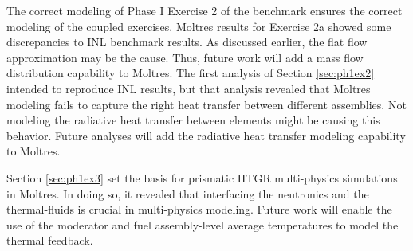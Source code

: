 The correct modeling of Phase I Exercise 2 of the benchmark ensures the correct modeling of the coupled exercises.
Moltres results for Exercise 2a showed some discrepancies to INL benchmark results.
As discussed earlier, the flat flow approximation may be the cause.
Thus, future work will add a mass flow distribution capability to Moltres.
The first analysis of Section \ref{sec:ph1ex2} intended to reproduce INL results, but that analysis revealed that Moltres modeling fails to capture the right heat transfer between different assemblies.
Not modeling the radiative heat transfer between elements might be causing this behavior.
Future analyses will add the radiative heat transfer modeling capability to Moltres.

Section \ref{sec:ph1ex3} set the basis for prismatic HTGR multi-physics simulations in Moltres.
In doing so, it revealed that interfacing the neutronics and the thermal-fluids is crucial in multi-physics modeling.
Future work will enable the use of the moderator and fuel assembly-level average temperatures to model the thermal feedback.




